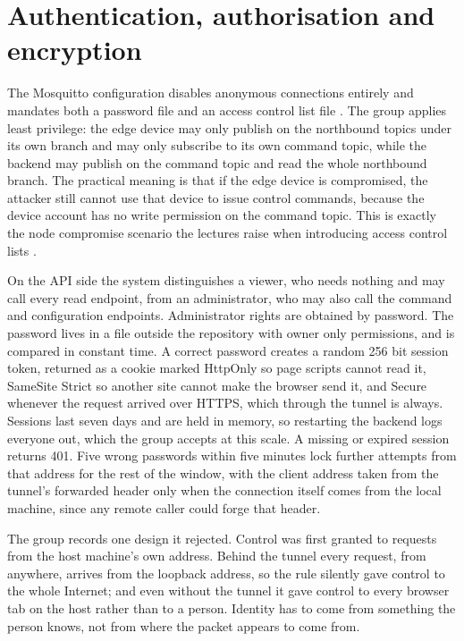 \section{Authentication, authorisation and encryption}

The Mosquitto configuration disables anonymous connections entirely and mandates both a password file and an access control list file \cite{mosquitto}. The group applies least privilege: the edge device may only publish on the northbound topics under its own branch and may only subscribe to its own command topic, while the backend may publish on the command topic and read the whole northbound branch. The practical meaning is that if the edge device is compromised, the attacker still cannot use that device to issue control commands, because the device account has no write permission on the command topic. This is exactly the node compromise scenario the lectures raise when introducing access control lists \cite{slide03}.

On the API side the system distinguishes a viewer, who needs nothing and may call every read endpoint, from an administrator, who may also call the command and configuration endpoints. Administrator rights are obtained by password. The password lives in a file outside the repository with owner only permissions, and is compared in constant time. A correct password creates a random 256 bit session token, returned as a cookie marked HttpOnly so page scripts cannot read it, SameSite Strict so another site cannot make the browser send it, and Secure whenever the request arrived over HTTPS, which through the tunnel is always. Sessions last seven days and are held in memory, so restarting the backend logs everyone out, which the group accepts at this scale. A missing or expired session returns 401. Five wrong passwords within five minutes lock further attempts from that address for the rest of the window, with the client address taken from the tunnel's forwarded header only when the connection itself comes from the local machine, since any remote caller could forge that header.

The group records one design it rejected. Control was first granted to requests from the host machine's own address. Behind the tunnel every request, from anywhere, arrives from the loopback address, so the rule silently gave control to the whole Internet; and even without the tunnel it gave control to every browser tab on the host rather than to a person. Identity has to come from something the person knows, not from where the packet appears to come from.

